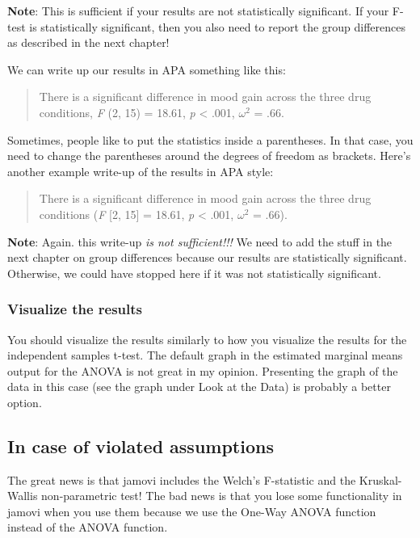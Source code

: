 \documentclass[
]{book}
\begin{document}
\textbf{Note}: This is sufficient if your results are not statistically significant. If your F-test is statistically significant, then you also need to report the group differences as described in the next chapter!

We can write up our results in APA something like this:

\begin{quote}
There is a significant difference in mood gain across the three drug conditions, \emph{F} (2, 15) = 18.61, \emph{p} \textless{} .001, \(\omega^2\) = .66.
\end{quote}

Sometimes, people like to put the statistics inside a parentheses. In that case, you need to change the parentheses around the degrees of freedom as brackets. Here's another example write-up of the results in APA style:

\begin{quote}
There is a significant difference in mood gain across the three drug conditions (\emph{F} {[}2, 15{]} = 18.61, \emph{p} \textless{} .001, \(\omega^2\) = .66).
\end{quote}

\textbf{Note}: Again. this write-up \emph{is not sufficient!!!} We need to add the stuff in the next chapter on group differences because our results are statistically significant. Otherwise, we could have stopped here if it was not statistically significant.

\hypertarget{visualize-the-results-5}{%
\subsubsection{Visualize the results}\label{visualize-the-results-5}}

You should visualize the results similarly to how you visualize the results for the independent samples t-test. The default graph in the estimated marginal means output for the ANOVA is not great in my opinion. Presenting the graph of the data in this case (see the graph under Look at the Data) is probably a better option.

\hypertarget{in-case-of-violated-assumptions-4}{%
\subsection{In case of violated assumptions}\label{in-case-of-violated-assumptions-4}}

The great news is that jamovi includes the Welch's F-statistic and the Kruskal-Wallis non-parametric test! The bad news is that you lose some functionality in jamovi when you use them because we use the One-Way ANOVA function instead of the ANOVA function.
\end{document}
